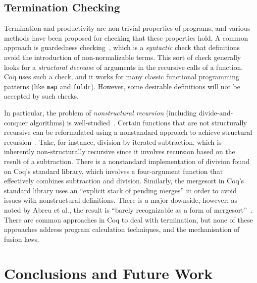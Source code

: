 \documentclass{llncs}
\newcommand{\haskell}[1]{\texttt{#1}}
\begin{document}
\subsection{Termination Checking}\label{sec:termcheck}

Termination and productivity are non-trivial properties of programs, and various
methods have been proposed for checking that these properties hold. A common
approach is guardedness checking~\cite{Eduardo94}, which is a
\emph{syntactic} check that definitions avoid the introduction of
non-normalizable terms. This sort of check generally looks for a
\emph{structural decrease} of arguments in the recursive calls of a function.
Coq uses such a check, and it works for many classic functional programming
patterns (like \haskell{map} and \haskell{foldr}). However, some desirable
definitions will not be accepted by such checks.

In particular, the problem of \emph{nonstructural recursion} (including
divide-and-conquer algorithms) is well-studied~\cite{BoveKS16}.
Certain functions that are not structurally recursive can be reformulated using
a nonstandard approach to achieve structural recursion~\cite{AbreuDHJMS23}.
Take, for instance, division by iterated subtraction, which is inherently
non-structurally recursive since it involves recursion based on the result of a
subtraction. There is a nonstandard implementation of divivion found on Coq's
standard library, which involves a four-argument function that effectively
combines subtraction and division. Similarly, the mergesort in Coq's standard
library uses an ``explicit stack of pending merges'' in order to avoid issues
with nonstructural definitions. There is a major downside, however; as noted by
Abreu et al., the result is ``barely recognizable as a form of
mergesort''~\cite{AbreuDHJMS23}.
There are common approaches in Coq to deal with termination, but none of these
approaches address program calculation techniques, and the mechanisation of
fusion laws.

\section{Conclusions and Future Work}
\end{document}
